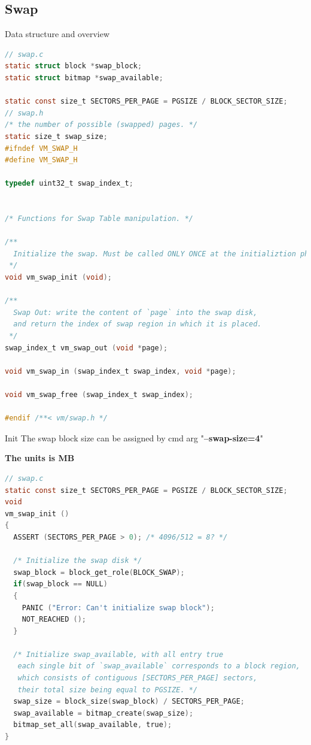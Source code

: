 \documentclass[10pt]{beamer}
\begin{document}
\subsection{Swap}
\begin{frame}[fragile]{Data structure and overview}
\begin{lstlisting}[language=C]
// swap.c
static struct block *swap_block;
static struct bitmap *swap_available;

static const size_t SECTORS_PER_PAGE = PGSIZE / BLOCK_SECTOR_SIZE;
// swap.h
/* the number of possible (swapped) pages. */
static size_t swap_size;
#ifndef VM_SWAP_H
#define VM_SWAP_H

typedef uint32_t swap_index_t;


/* Functions for Swap Table manipulation. */

/**
  Initialize the swap. Must be called ONLY ONCE at the initializtion phase.
 */
void vm_swap_init (void);

/**
  Swap Out: write the content of `page` into the swap disk,
  and return the index of swap region in which it is placed.
 */
swap_index_t vm_swap_out (void *page);

void vm_swap_in (swap_index_t swap_index, void *page);

void vm_swap_free (swap_index_t swap_index);

#endif /**< vm/swap.h */

\end{lstlisting}
\end{frame}
\begin{frame}[fragile]{Init}
The swap block size can be assigned by cmd arg "\textbf{--swap-size=4}"

\textbf{The units is MB}
\begin{lstlisting}[language=C]
// swap.c
static const size_t SECTORS_PER_PAGE = PGSIZE / BLOCK_SECTOR_SIZE;
void
vm_swap_init ()
{
  ASSERT (SECTORS_PER_PAGE > 0); /* 4096/512 = 8? */

  /* Initialize the swap disk */
  swap_block = block_get_role(BLOCK_SWAP);
  if(swap_block == NULL) 
  {
    PANIC ("Error: Can't initialize swap block");
    NOT_REACHED ();
  }

  /* Initialize swap_available, with all entry true
   each single bit of `swap_available` corresponds to a block region,
   which consists of contiguous [SECTORS_PER_PAGE] sectors,
   their total size being equal to PGSIZE. */
  swap_size = block_size(swap_block) / SECTORS_PER_PAGE;
  swap_available = bitmap_create(swap_size);
  bitmap_set_all(swap_available, true);
}
\end{lstlisting}
\end{frame}
\end{document}
